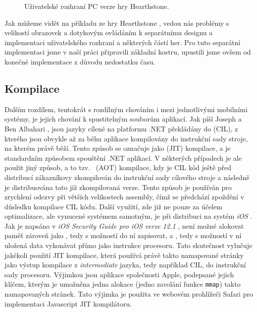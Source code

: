 \begin{figure}[!tbp]
	\centering
	\hfill
	\caption{Uživatelské rozhraní PC verze hry Hearthstone.}
	\label{fig:hearthstone_pc}
\end{figure}

Jak můžeme vidět na příkladu ze hry Hearthstone \citep{site:hearthstone}, vedou nás problémy s velikostí obrazovek a dotykovým ovládáním k separátnímu designu a implementaci uživatelského rozhraní a některých částí her. Pro tuto separátní implementaci jsme v naší práci připravili základní kostru, upustili jsme ovšem od konečné implementace z důvodu nedostatku času.

\subsection{Kompilace}
Dalším rozdílem, tentokrát s rozdílným chováním i mezi jednotlivými mobilními systémy, je jejich chování k spustitelným souborům aplikací. Jak píší Joseph a Ben Albahari \citep[str.~3,4]{book:cs7nutshell}, jsou jazyky cílené na platformu .NET překládány do   (CIL), z kterého jsou obvykle až za běhu aplikace kompilovány do instrukční sady stroje, na kterém právě běží. Tento způsob se označuje jako   (JIT) kompilace, a je standardním způsobem spouštění .NET aplikací. V některých případech je ale použit jiný způsob, a to tzv.~  (AOT) kompilace, kdy je CIL kód ještě před distribucí zákazníkovy zkompilován do instrukční sady cílového stroje a následně je distribuována tato již zkompilovaná verze. Tento způsob je používán pro zrychlení odezvy při větších velikostech assembly, čímž se předchází zpoždění v důsledku kompilace CIL kódu. Další využití, zde již ne pouze za účelem optimalizace, ale vynucené systémem samotným, je při distribuci na systém \emph{iOS} \citep{site:aot}. Jak je napsáno v \textit{iOS Security Guide pro iOS verze 12.1} \citep[str.~27]{book:iossecurityguide}, není možné alokovat paměť zároveň jako \textit{ }, tedy s možností do ní zapisovat, a \textit{ }, tedy s možností v ní uložená data vykonávat přímo jako instrukce procesoru. Tato skutečnost vylučuje jakékoli použití JIT kompilace, která používá právě takto namapované stránky jako výstup kompilace z \textit{intermediate} jazyka, tedy například CIL, do instrukční sady procesoru. Výjimkou jsou aplikace společnosti Apple, podepsané jejich klíčem, kterým je umožněna jedna alokace (jedno zavolání funkce \texttt{mmap}) takto namapovaných stránek. Tato výjimka je použita ve webovém prohlížeči Safari pro implementaci Javascript JIT kompilátoru.  

